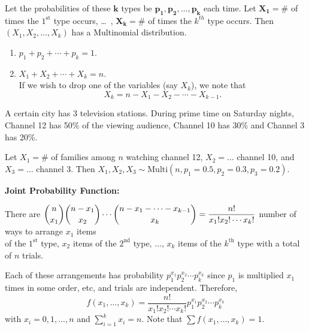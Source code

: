 Let the probabilities of these $\mathbf{k}$ types be $\mathbf{p_1,p_2,\ldots,p_k}$ each time. Let $\mathbf{X_1} = \#$ of times the $1^{\text{st}}$ type occurs, \dots \, , $\mathbf{X_k} = \#$ of times the $k^{th}$ type occurs. Then $\left( X_1,X_2,\ldots,X_k \right)$ has a Multinomial distribution.

\begin{note}
    \phantom{}
    \begin{enumerate}
        \item $p_1 + p_2 + \cdots + p_k = 1$.
        \item $X_1 + X_2 + \cdots + X_k = n$. \\
        If we wish to drop one of the variables (say $X_k$), we note that \vspace{-3mm}
        \[
            X_k = n - X_1 - X_2 - \cdots - X_{k-1}.
        \]
    \end{enumerate}
\end{note}

\begin{example}
    A certain city has 3 television stations. During prime time on Saturday nights, Channel 12 has 50\% of the viewing audience, Channel 10 has 30\% and Channel 3 has 20\%.

    Let $X_1 = \#$ of families among $n$ watching channel 12, $X_2 = \ldots$ channel 10, and $X_3 = \ldots$ channel 3. Then $X_1,X_2,X_3 \sim \text{Multi}(n,p_1 = 0.5,p_2 = 0.3,p_3 = 0.2)$. \\
\end{example}

\textbf{Joint Probability Function:}

There are $\displaystyle \binom{n}{x_1} \binom{n-x_1}{x_2} \cdots \binom{n-x_1 - \cdots - x_{k-1}}{x_k} = \frac{n!}{x_1! x_2! \cdots x_k!}$ number of ways to arrange $x_1$ items \vspace{-3mm} \\ 
of the $1^{\text{st}}$ type, $x_2$ items of the $2^{\text{nd}}$ type, $\ldots$, $x_k$ items of the $k^{\text{th}}$ type with a total of $n$ trials.

Each of these arrangements has probability $p_1^{x_1}p_2^{x_2} \cdots p_k^{x_k}$ since $p_1$ is multiplied $x_1$ times in some order, etc, and trials are independent. Therefore,
\[
    f(x_1,\ldots ,x_k) = \frac{n!}{x_1! x_2! \cdots x_k!} p_1^{x_1}p_2^{x_2} \cdots p_k^{x_k}
\]
with $x_i = 0,1,\ldots ,n$ and $\displaystyle \sum_{i=1}^{k} x_i = n$.
Note that $\displaystyle \sum f(x_1,\ldots ,x_k) = 1$.

